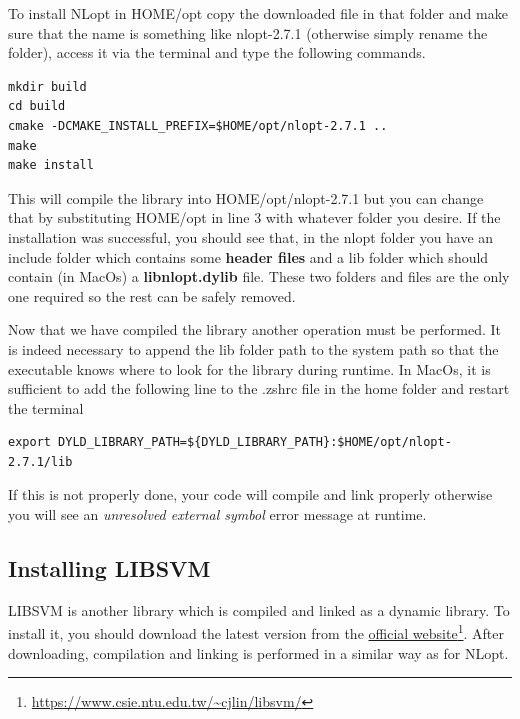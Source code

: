 \documentclass{ol-softwaremanual}
\newcommand{\doclink}[2]{\href{#1}{#2}\footnote{\url{#1}}}
\begin{document}
\smallskip
To install NLopt in HOME/opt copy the downloaded file in that folder and make sure that the name is something like nlopt-2.7.1 (otherwise simply rename the folder), access it via the terminal and type the following commands.

\begin{listing}[H]
\begin{verbatim}
mkdir build
cd build
cmake -DCMAKE_INSTALL_PREFIX=$HOME/opt/nlopt-2.7.1 ..
make
make install
\end{verbatim}
\end{listing}

This will compile the library into HOME/opt/nlopt-2.7.1 but you can change that by substituting HOME/opt in line 3 with whatever folder you desire. If the installation was successful, you should see that, in the nlopt folder you have an include folder which contains some \textbf{header files} and a lib folder which should contain (in MacOs) a \textbf{libnlopt.dylib} file. These two folders and files are the only one required so the rest can be safely removed. 

\smallskip
Now that we have compiled the library another operation must be performed. It is indeed necessary to append the lib folder path to the system path so that the executable knows where to look for the library during runtime. In MacOs, it is sufficient to add the following line to the .zshrc file in the home folder and restart the terminal 

\begin{listing}[H]
\begin{verbatim}
export DYLD_LIBRARY_PATH=${DYLD_LIBRARY_PATH}:$HOME/opt/nlopt-2.7.1/lib
\end{verbatim}
\end{listing}

If this is not properly done, your code will compile and link properly otherwise you will see an \textit{unresolved external symbol} error message at runtime.

\subsection{Installing LIBSVM}
LIBSVM is another library which is compiled and linked as a dynamic library. To install it, you should download the latest version from the \doclink{https://www.csie.ntu.edu.tw/~cjlin/libsvm/}{official website}. After downloading, compilation and linking is performed in a similar way as for NLopt.
\end{document}
